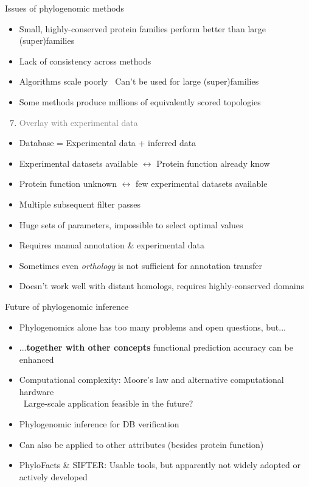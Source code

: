 \documentclass[14pt,xcolor=dvipsnames,pdftex]{beamer}
\begin{document}
\begin{frame}[allowframebreaks]{Issues of phylogenomic methods}
\begin{itemize}
  \item Small, highly-conserved protein families perform better than large (super)families
  \item Lack of consistency across methods
  \item Algorithms scale poorly
  \textrightarrow\ Can't be used for large (super)families
  \item Some methods produce millions of equivalently scored topologies
 \end{itemize}
 \framebreak
 \begin{enumerate}
  \setcounter{enumi}{6}
  \item \textcolor{gray}{Overlay with experimental data}
 \end{enumerate}
 \begin{itemize}
  \item Database = Experimental data + inferred data
  \item Experimental datasets available
        $\leftrightarrow$ Protein function already know
  \item Protein function unknown $\leftrightarrow$ few experimental datasets available
 \end{itemize}
 \framebreak
 \begin{itemize}
  \item Multiple subsequent filter passes
  \item Huge sets of parameters, impossible to select optimal values
  \item Requires manual annotation \& experimental data
  \item Sometimes even \textit{orthology} is not sufficient for annotation transfer
  \item Doesn't work well with distant homologs, requires highly-conserved domains
  \end{itemize}
\end{frame}

\begin{frame}{Future of phylogenomic inference}
 \begin{itemize}
  \item Phylogenomics alone has too many problems and open questions, but...
  \pause
  \item ...\textbf{together with other concepts} functional prediction accuracy can be enhanced
  \item Computational complexity: Moore's law and alternative computational hardware\\
  \textrightarrow\ Large-scale application feasible in the future?
  \item Phylogenomic inference for DB verification
  \item Can also be applied to other attributes (besides protein function)
  \item PhyloFacts \& SIFTER: Usable tools, but apparently not widely adopted or actively developed
 \end{itemize}
\end{frame}
\end{document}

